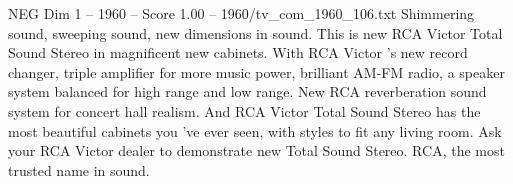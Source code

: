 \begin{textsample}{NEG Dim 1 – 1960 – Score 1.00 – 1960/tv\_com\_1960\_106.txt}  \label{ex:f1_neg_073}
Shimmering sound, sweeping sound, new dimensions in sound.
This is new RCA Victor Total Sound Stereo in magnificent new cabinets.
With RCA Victor 's new record changer, triple amplifier for more music power, brilliant AM-FM radio, a speaker system balanced for high range and low range.
New RCA reverberation sound system for concert hall realism.
And RCA Victor Total Sound Stereo has the most beautiful cabinets you 've ever seen, with styles to fit any living room.
Ask your RCA Victor dealer to demonstrate new Total Sound Stereo.
RCA, the most trusted name in sound.

\end{textsample}
